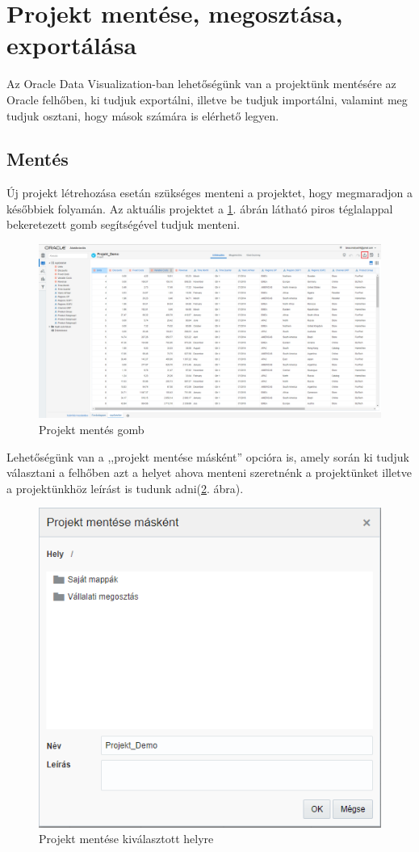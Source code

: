 \section{Projekt mentése, megosztása, exportálása}
Az Oracle Data Visualization-ban lehetőségünk van a projektünk mentésére az Oracle felhőben, ki tudjuk exportálni, illetve be tudjuk importálni, valamint meg tudjuk osztani, hogy mások számára is elérhető legyen.

\subsection{Mentés}
Új projekt létrehozása esetán szükséges menteni a projektet, hogy megmaradjon a későbbiek folyamán. Az aktuális projektet a \ref{fig:mentesgomb}. ábrán látható piros téglalappal bekeretezett gomb segítségével tudjuk menteni.

\begin{figure}[!h]
	\centering
	\includegraphics[width=1.0\linewidth]{matyi_imgs/mentesgomb}
	\caption[Projekt mentés gomb]{Projekt mentés gomb}
	\label{fig:mentesgomb}
\end{figure}

Lehetőségünk van a ,,projekt mentése másként'' opcióra is, amely során ki tudjuk választani a felhőben azt a helyet ahova menteni szeretnénk a projektünket illetve a projektünkhöz leírást is tudunk adni(\ref{fig:mentesmaskent}. ábra).

\begin{figure}[!h]
	\centering
	\includegraphics[width=0.7\linewidth]{matyi_imgs/mentesmaskent}
	\caption[Projekt mentése kiválasztott helyre]{Projekt mentése kiválasztott helyre}
	\label{fig:mentesmaskent}
\end{figure}

